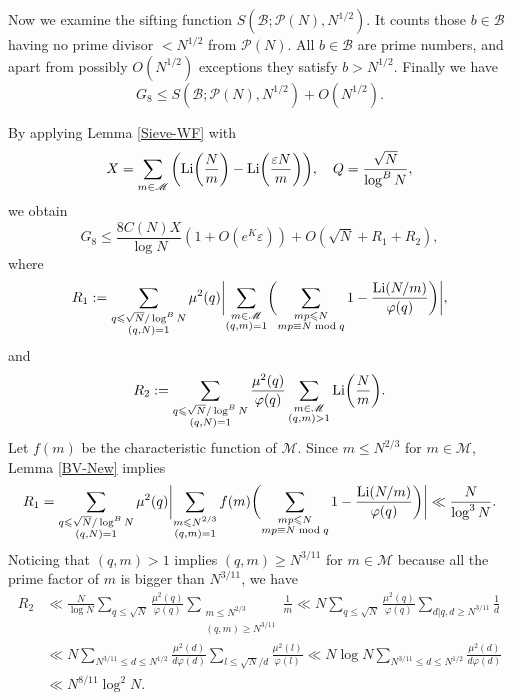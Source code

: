 \documentclass[12pt, a4paper]{amsart}
\def\Li{\hbox{{\rm Li}}}
\def\leq{\leqslant}
\def\le{\leqslant}
\theoremstyle{plain}
\theoremstyle{remark}
\numberwithin{equation}{section}
\begin{document}
Now we examine the sifting function $S(\mathscr{B}; \mathscr{P}(N), N^{1/2})$.
It counts those $b\in\mathscr{B}$ having no prime divisor $< N^{1/2}$ from
$\mathscr{P}(N)$.
All $b\in\mathscr{B}$ are prime numbers, and apart from possibly $O(N^{1/2})$
exceptions they satisfy $b> N^{1/2}$. 
Finally we have
$$
G_8 \le S(\mathscr{B}; \mathscr{P}(N), N^{1/2}) + O(N^{1/2}). 
$$

By applying Lemma \ref{Sieve-WF} with
$$
X = \sum_{m \in \mathscr{M}} \bigg(\Li\bigg( \frac{N}{m} \bigg)-\Li\bigg( \frac{\varepsilon N}{m} \bigg)\bigg), 
\quad Q = \frac{\sqrt{N}}{\log^{B} N},
$$
we obtain
\begin{equation}\label{G8old}
G_8 \leq \frac{8 C(N) X}{\log N} ( 1 + O(e^K\varepsilon) ) + O(\sqrt{N} + R_1 + R_2),
\end{equation}
where
$$ 
R_1 := \sum_{\substack{q \leqslant \sqrt{N}/\log^{B} N \\ (q,N)=1}} \mu^2(q) \biggl| \sum_{\substack{m \in \mathscr{M} \\ (q,m)=1}} \biggl( \sum_{\substack{mp \leqslant N \\ mp \equiv N \bmod q}} 1 - \frac{\Li(N/m)}{\varphi(q)} \biggr) \biggr|, 
$$
and 
$$ 
R_2 := \sum_{\substack{q \leqslant \sqrt{N}/\log^{B} N \\ (q,N)=1}} \frac{\mu^2(q)}{\varphi(q)} 
\sum_{\substack{m \in \mathscr{M} \\ (q,m)>1}}
\Li\biggl(\frac{N}{m}\biggr). 
$$
Let $f(m)$ be the characteristic function of $\mathscr{M}$. Since $m \leqslant N^{2/3}$ for $m \in \mathscr{M}$, Lemma \ref{BV-New} implies
\begin{equation}
R_1 = \sum_{\substack{q \leqslant \sqrt{N}/\log^{B} N \\ (q,N)=1}} \mu^2(q) \biggl| \sum_{\substack{m \leqslant N^{2/3} \\ (q,m)=1}} f(m) \biggl( \sum_{\substack{mp \leqslant N \\ mp \equiv N \bmod q}} 1 - \frac{\Li(N/m)}{\varphi(q)} \biggr) \biggr| \ll \frac{N}{\log^{3} N}.
\end{equation}
Noticing that $(q,m) > 1$ implies $(q,m) \geqslant N^{3/11}$ for 
$m \in \mathscr{M}$ because all the prime factor of $m$ is bigger than $N^{3/11}$, we have
\begin{equation}\label{Chen-R2}
\begin{split}
R_2 &\ll \frac{N}{\log N} \sum_{q \leqslant \sqrt{N}} \frac{\mu^2(q)}{\varphi(q)} 
\sum_{\substack{m \leqslant N^{2/3} \\ (q,m) \geqslant N^{3/11}}} \frac{1}{m} 
\ll N \sum_{q \leqslant \sqrt{N}} \frac{\mu^2(q)}{\varphi(q)} \sum_{d|q, d \geqslant N^{3/11}} \frac{1}{d} \\
&\ll N \sum_{N^{3/11} \le d \leqslant N^{1/2}} \frac{\mu^2(d)}{d\varphi(d)} 
\sum_{l \leqslant \sqrt{N}/d} \frac{\mu^2(l)}{\varphi(l)} \ll N \log N \sum_{N^{3/11} \le d \leqslant N^{1/2}} \frac{\mu^2(d)}{d\varphi(d)}\\
&\ll N^{8/11} \log^2 N.
\end{split}
\end{equation}
\end{document}
